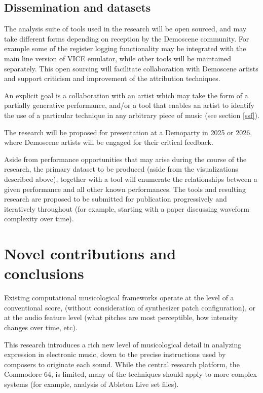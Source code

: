 \documentclass[10pt]{article}
\begin{document}
\begin{multicols*}{2}
  \subsection{Dissemination and datasets}

The analysis suite of tools used in the research will be open sourced, and may take different forms depending on reception by the Demoscene community. For example some of the register logging functionality may be integrated with the main line version of VICE emulator, while other tools will be maintained separately. This open sourcing will facilitate collaboration with Demoscene artists and support criticism and improvement of the attribution techniques.

An explicit goal is a collaboration with an artist which may take the form of a partially generative performance, and/or a tool that enables an artist to identify the use of a particular technique in any arbitrary piece of music (see section \ref{ssf}).

The research will be proposed for presentation at a Demoparty in 2025 or 2026, where Demoscene artists will be engaged for their critical feedback.

Aside from performance opportunities that may arise during the course of the research, the primary dataset to be produced (aside from the visualizations described above), together with a tool will enumerate the relationships between a given performance and all other known performances.	The tools and resulting research are proposed to be submitted for publication progressively and iteratively throughout (for example, starting with a paper discussing waveform complexity over time).

\section{Novel contributions and conclusions}

Existing computational musicological frameworks operate at the level of a conventional score, (without consideration of synthesizer patch configuration), or at the audio feature level (what pitches are most perceptible, how intensity changes over time, etc).

This research introduces a rich new level of musicological detail in analyzing expression in electronic music, down to the precise instructions used by composers to originate each sound. While the central research platform, the Commodore 64, is limited, many of the techniques should apply to more complex systems (for example, analysis of Ableton Live set files).


\end{multicols*}
\end{document}
